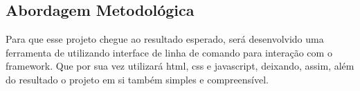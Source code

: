 \subsection{Abordagem Metodológica}

\par Para que esse projeto chegue ao resultado esperado, será desenvolvido uma ferramenta de utilizando interface de linha 
de comando para interação com o framework. Que por sua vez utilizará html, css e javascript, deixando, assim, além do resultado 
o projeto em si também simples e compreensível.
